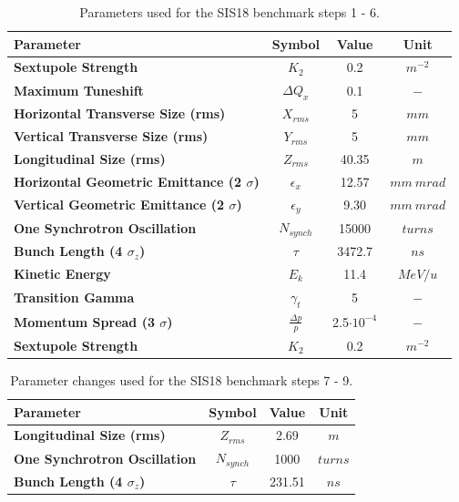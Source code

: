 \documentclass[a4paper]{cernatsnote}
\begin{document}
\begin{table}
	\begin{center}
		\begin{tabular}[!b]{|l|c|c|c|}
			\hline
			\textbf{Parameter} & \textbf{Symbol} & \textbf{Value} & \textbf{Unit} \\
			\hline
			\textbf{Sextupole Strength} & $K_2$ & 0.2 & $m^{-2}$ \\
			\textbf{Maximum Tuneshift} & $\Delta Q_x$ & 0.1 & $-$ \\
			\textbf{Horizontal Transverse Size (rms)} & $X_{rms}$ & 5 & $mm$ \\
			\textbf{Vertical Transverse Size (rms)} & $Y_{rms}$ & 5 & $mm$ \\
			\textbf{Longitudinal Size (rms)} & $Z_{rms}$ & 40.35 & $m$ \\
			\textbf{Horizontal Geometric Emittance (2 $\sigma$)} & $\epsilon_x$ & 12.57 & $mm~mrad$ \\
			\textbf{Vertical Geometric Emittance (2 $\sigma$)} & $\epsilon_y$ & 9.30 & $mm~mrad$ \\
			\textbf{One Synchrotron Oscillation} & $N_{synch}$ & 15000 & $turns$ \\
			\textbf{Bunch Length (4 $\sigma_z$)} & $\tau$ & 3472.7 & $ns$ \\
			\textbf{Kinetic Energy} & $E_k$ & 11.4 & $MeV/u$ \\
			\textbf{Transition Gamma} & $\gamma_t$ & 5 & $-$ \\
			\textbf{Momentum Spread (3 $\sigma$)} & $\frac{\Delta p}{p}$ & 2.5$\cdot 10^{-4}$ & $-$ \\
			\textbf{Sextupole Strength} & $K_2$ & 0.2 & $m^{-2}$ \\
			\hline
		\end{tabular}
		\caption{Parameters used for the SIS18 benchmark steps 1 - 6.}
		\label{tab:parameters16}
	\end{center}
\end{table}

\begin{table}
	\begin{center}
		\begin{tabular}[!b]{|l|c|c|c|}
			\hline
			\textbf{Parameter} & \textbf{Symbol} & \textbf{Value} & \textbf{Unit} \\
			\hline
			\textbf{Longitudinal Size (rms)} & $Z_{rms}$ & 2.69 & $m$ \\
			\textbf{One Synchrotron Oscillation} & $N_{synch}$ & 1000 & $turns$ \\
			\textbf{Bunch Length (4 $\sigma_z$)} & $\tau$ &  231.51 & $ns$ \\
			\hline
		\end{tabular}
		\caption{Parameter changes used for the SIS18 benchmark steps 7 - 9.}
		\label{tab:parameters79}
	\end{center}
\end{table}
\end{document}
